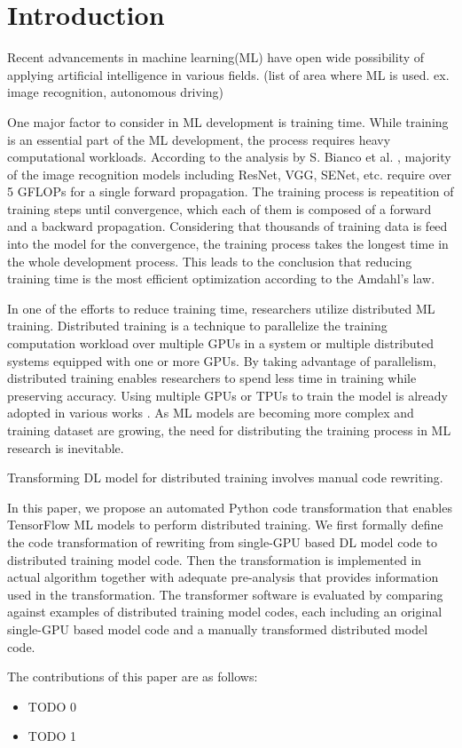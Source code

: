 \section{Introduction}\label{sec:intro}

Recent advancements in machine learning(ML) have open wide possibility of
applying artificial intelligence in various fields.
(list of area where ML is used. ex. image recognition, autonomous driving)

One major factor to consider in ML development is training time.
While training is an essential part of the ML development,
the process requires heavy computational workloads.
According to the analysis by S. Bianco et al. \cite{bianco2018benchmark},
majority of the image recognition models including ResNet, VGG, SENet, etc.
require over 5 GFLOPs for a single forward propagation.
The training process is repeatition of training steps until convergence,
which each of them is composed of a forward and a backward propagation.
Considering that thousands of training data is feed into the model
for the convergence, the training process takes the longest time
in the whole development process. This leads to the conclusion that
reducing training time is the most efficient optimization according to
the Amdahl's law.

In one of the efforts to reduce training time, 
researchers utilize distributed ML training.
Distributed training is a technique to parallelize the training computation
workload over multiple GPUs in a system or multiple distributed systems
equipped with one or more GPUs.
By taking advantage of parallelism, distributed training enables researchers
to spend less time in training while preserving accuracy.
Using multiple GPUs or TPUs to train the model is already adopted
in various works \cite{brown2020gpt-3} \cite{silver2017alphazero}
\cite{zhang2019distrspeech} \cite{tian2020distrwebattack}.
As ML models are becoming more complex and training dataset are growing,
the need for distributing the training process in ML research is inevitable.

Transforming DL model for distributed training involves manual code rewriting.

In this paper, we propose an automated Python code transformation that enables
TensorFlow ML models to perform distributed training.
We first formally define the code transformation of rewriting from
single-GPU based DL model code to distributed training model code.
Then the transformation is implemented in actual algorithm together with
adequate pre-analysis that provides information used in the transformation.
The transformer software is evaluated by comparing against 
examples of distributed training model codes, 
each including an original single-GPU based model code 
and a manually transformed distributed model code.

The contributions of this paper are as follows:

\begin{itemize}
  \item TODO 0
  \item TODO 1
\end{itemize}
